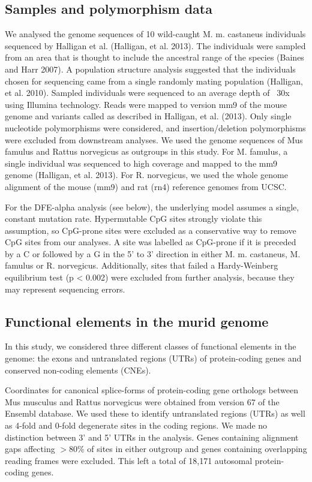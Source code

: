 \subsection{Samples and polymorphism data}
 
We analysed the genome sequences of 10 wild-caught M. m. castaneus individuals sequenced by Halligan et al. (Halligan, et al. 2013). The individuals were sampled from an area that is thought to include the ancestral range of the species (Baines and Harr 2007). A population structure analysis suggested that the individuals chosen for sequencing came from a single randomly mating population (Halligan, et al. 2010). Sampled individuals were sequenced to an average depth of ~30x using Illumina technology. Reads were mapped to version mm9 of the mouse genome and variants called as described in Halligan, et al. (2013). Only single nucleotide polymorphisms were considered, and insertion/deletion polymorphisms were excluded from downstream analyses. We used the genome sequences of Mus famulus and Rattus norvegicus as outgroups in this study. For M. famulus, a single individual was sequenced to high coverage and mapped to the mm9 genome (Halligan, et al. 2013). For R. norvegicus, we used the whole genome alignment of the mouse (mm9) and rat (rn4) reference genomes from UCSC. 

	For the DFE-alpha analysis (see below), the underlying model assumes a single, constant mutation rate. Hypermutable CpG sites strongly violate this assumption, so CpG-prone sites were excluded as a conservative way to remove CpG sites from our analyses. A site was labelled as CpG-prone if it is preceded by a C or followed by a G in the 5’ to 3’ direction in either M. m. castaneus, M. famulus or R. norvegicus. Additionally, sites that failed a Hardy-Weinberg equilibrium test (p < 0.002) were excluded from further analysis, because they may represent sequencing errors.
 
\subsection{Functional elements in the murid genome}
        
In this study, we considered three different classes of functional elements in the genome: the exons and untranslated regions (UTRs) of protein-coding genes and conserved non-coding elements (CNEs).

Coordinates for canonical splice-forms of protein-coding gene orthologs between Mus musculus and Rattus norvegicus were obtained from version 67 of the Ensembl database. We used these to identify untranslated regions (UTRs) as well as 4-fold and 0-fold degenerate sites in the coding regions. We made no distinction between 3’ and 5’ UTRs in the analysis. Genes containing alignment gaps affecting $>$80\% of sites in either outgroup and genes containing overlapping reading frames were excluded. This left a total of 18,171 autosomal protein-coding genes.
 
